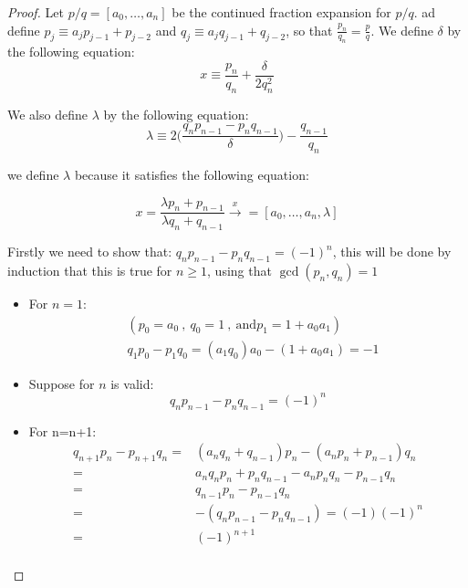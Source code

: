 \begin{proof}
Let $p/q = [a_0, \dots, a_n]$ be the continued fraction expansion for $p/q$. ad define $p_j \equiv a_j p_{j-1} + p_{j-2}$ and $q_j \equiv a_j q_{j-1} + q_{j-2}$, so that $\frac{p_n}{q_n} = \frac{p}{q}$. We define $\delta$ by the following equation: 
\begin{equation}
    \label{eq: Delta equation}
    x \equiv \frac{p_n}{q_n} + \frac{\delta}{2 q_n^2}
\end{equation}

We also define $\lambda$ by the following equation:
\begin{equation}
    \label{Eq: lambda equation}
    \lambda \equiv 2 \bigg( \frac{q_n p_{n-1} - p_n q_{n-1}}{\delta} \bigg) - \frac{q_{n-1}}{q_n}
\end{equation}

we define $\lambda$ because it satisfies the following equation:

\begin{equation*}
    x = \frac{\lambda p_n + p_{n-1}}{\lambda q_n + q_{n-1}} \xrightarrow x = [a_0, \dots, a_n, \lambda]
\end{equation*}

Firstly we need to show that: $q_n p_{n-1} - p_n q_{n-1} = (-1)^n$, this will be done by induction that this is true for $n \geq 1$, using that $\gcd (p_n, q_n) = 1$
\begin{itemize}
    \item For $n=1$: 
    \begin{equation*}
    \begin{split}
        & (p_0 = a_0 \ , \ q_0 = 1 \ ,\ \mathrm{and} p_1 = 1 + a_0 a_1) \\
        & q_1 p_0 - p_1 q_0 = (a_1 q_0) a_0 - (1 + a_0 a_1) = -1
    \end{split}
    \end{equation*}
    
    \item Suppose for $n$ is valid:
    \begin{equation*}
        q_n p_{n-1} - p_n q_{n-1} = (-1)^n
    \end{equation*}
    
    \item For n=n+1:
    \begin{equation*}
    \begin{split}
        q_{n+1} p_n - p_{n+1} q_n = & (a_n q_n + q_{n-1}) p_n - (a_n p_n + p_{n-1}) q_n \\
        = & a_n q_n p_n + p_n q_{n-1} - a_n p_n q_n - p_{n-1} q_n \\
        = & q_{n-1} p_n - p_{n-1} q_n  \\
        = & -(q_n p_{n-1} - p_n q_{n-1}) = (-1) (-1)^n \\
        = & (-1)^{n+1} \\
    \end{split}
    \end{equation*}
\end{itemize}


\end{proof}
